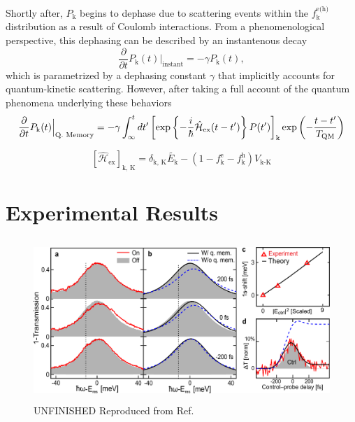 Shortly after, $P_\text{k}$ begins to dephase due to scattering events within the $f_\text{k}^\text{e(h)}$ distribution as a result of Coulomb interactions. From a phenomenological perspective, this dephasing can be described by an instantenous decay
\begin{equation}
	\dfrac{\partial}{\partial t} P_\text{k}(t) \Big|_\text{instant} = -\gamma P_\text{k}(t),
\end{equation}
which is parametrized by a dephasing constant $\gamma$ that implicitly accounts for quantum-kinetic scattering. However, after taking a full account of the quantum phenomena underlying these behaviors
\begin{equation}
	\dfrac{\partial}{\partial t} P_\text{k}(t) \Big|_\text{Q. Memory} = -\gamma \int^{t}_{\infty} dt' \left[ \exp\left\{ - \frac{\small i}{ \small \hbar} \hat{\mathcal{H}}_\text{ex}(t-t') \right\} P(t') \right]_\text{k} \exp \left(- \frac{t-t'}{T_\text{QM}} \right)
\end{equation}

\begin{equation}
	\left[ \hat{\mathcal{H}}_\text{ex} \right]_\text{k, K}= \delta_\text{k, K} \tilde{E_\text{k}} - (1 - f_\text{k}^\text{e} - f_\text{k}^\text{h}) V_\text{k-K}
\end{equation}


\section{Experimental Results}

\begin{figure}[H]
	\centering
	\includegraphics[height=2.4in]{images/chapter_coherent/nonresonant}
	\caption{{\color{red}UNFINISHED} Reproduced from Ref.\ \cite{mack2019}}
\end{figure}

